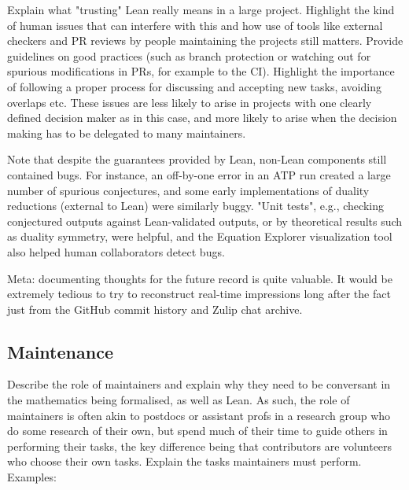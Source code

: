 Explain what "trusting" Lean really means in a large project. Highlight the kind of human issues that can interfere with this and how use of tools like external checkers and PR reviews by people maintaining the projects still matters. Provide guidelines on good practices (such as branch protection or watching out for spurious modifications in PRs, for example to the CI). Highlight the importance of following a proper process for discussing and accepting new tasks, avoiding overlaps etc. These issues are less likely to arise in projects with one clearly defined decision maker as in this case, and more likely to arise when the decision making has to be delegated to many maintainers.

Note that despite the guarantees provided by Lean, non-Lean components still contained bugs. For instance, an off-by-one error in an ATP run created a large number of spurious conjectures, and some early implementations of duality reductions (external to Lean) were similarly buggy. "Unit tests", e.g., checking conjectured outputs against Lean-validated outputs, or by theoretical results such as duality symmetry, were helpful, and the Equation Explorer visualization tool also helped human collaborators detect bugs.

Meta: documenting thoughts for the future record is quite valuable. It would be extremely tedious to try to reconstruct real-time impressions long after the fact just from the GitHub commit history and Zulip chat archive.

\subsection{Maintenance}

Describe the role of maintainers and explain why they need to be conversant in the mathematics being formalised, as well as Lean. As such, the role of maintainers is often akin to postdocs or assistant profs in a research group who do some research of their own, but spend much of their time to guide others in performing their tasks, the key difference being that contributors are volunteers who choose their own tasks. Explain the tasks maintainers must perform. Examples:

